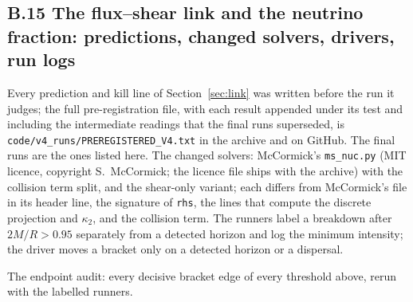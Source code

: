 \documentclass[11pt]{article}
\begin{document}
\subsection*{B.15 The flux--shear link and the neutrino fraction: predictions, changed solvers, drivers, run logs}
Every prediction and kill line of Section~\ref{sec:link} was written before the run it judges; the full pre-registration file, with each result appended under its test and including the intermediate readings that the final runs superseded, is \texttt{code/v4\_runs/PREREGISTERED\_V4.txt} in the archive and on GitHub. The final runs are the ones listed here. The changed solvers: McCormick's \texttt{ms\_nuc.py} (MIT licence, copyright S.~McCormick; the licence file ships with the archive) with the collision term split, and the shear-only variant; each differs from McCormick's file in its header line, the signature of \texttt{rhs}, the lines that compute the discrete projection and $\kappa_2$, and the collision term. The runners label a breakdown after $2M/R>0.95$ separately from a detected horizon and log the minimum intensity; the driver moves a bracket only on a detected horizon or a dispersal.
































The endpoint audit: every decisive bracket edge of every threshold above, rerun with the labelled runners.

\end{document}
